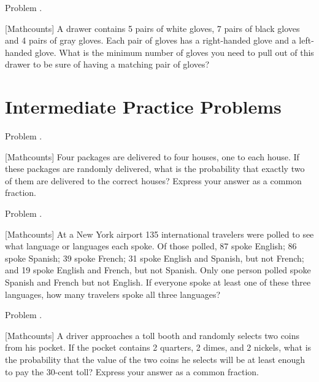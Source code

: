 \documentclass[9pt]{beamer}
\newcounter{problem}[section]
\begin{document}
\begin{frame}[t, fragile]{Problem \thesection.\theproblem}
    \begin{block}{}[Mathcounts]
     A drawer contains 5 pairs of white gloves, 7 pairs of black gloves and 4 pairs of gray gloves. Each pair of gloves has a right-handed glove and a left-handed glove. What is the minimum number of gloves you need to pull out of this drawer to be sure of having a matching pair of gloves?
    \end{block}
\end{frame}

\section{Intermediate Practice Problems}
\begin{frame}[t, fragile]{Problem \thesection.\theproblem}
    \begin{block}{}[Mathcounts]
    Four packages are delivered to four houses, one to each house. If these packages are randomly delivered, what is the probability that exactly two of them are delivered to the correct houses? Express your answer as a common fraction.
    \end{block}
\end{frame}

\begin{frame}[t, fragile]{Problem \thesection.\theproblem}
    \begin{block}{}[Mathcounts]
     At a New York airport 135 international travelers were polled to see what language or languages each spoke. Of those polled, 87 spoke English; 86 spoke Spanish; 39 spoke French; 31 spoke English and Spanish, but not French; and 19 spoke English and French, but not Spanish. Only one person polled spoke Spanish and French but not English. If everyone spoke at least one of these three languages, how many travelers spoke all three languages?
    \end{block}
\end{frame}
\begin{frame}[t, fragile]{Problem \thesection.\theproblem}
    \begin{block}{}[Mathcounts]
     A driver approaches a toll booth and randomly selects two coins from his pocket. If the pocket contains 2 quarters, 2 dimes, and 2 nickels, what is the probability that the value of the two coins he selects will be at least enough to pay the 30-cent toll? Express your answer as a common fraction.
    \end{block}
\end{frame}
\end{document}
